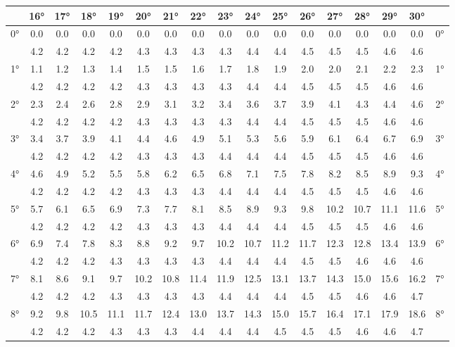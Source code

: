 \begin{scriptsize}\begin{tabular}{c || c | c | c | c | c | c | c | c | c | c | c | c | c | c | c || c}
		\space &16°&17°&18°&19°&20°&21°&22°&23°&24°&25°&26°&27°&28°&29°&30°\\\hline\hline
		\multirow{2}{*}{0°}&0.0&0.0&0.0&0.0&0.0&0.0&0.0&0.0&0.0&0.0&0.0&0.0&0.0&0.0&0.0&\multirow{2}{*}{0°}\\ \space&4.2&4.2&4.2&4.2&4.3&4.3&4.3&4.3&4.4&4.4&4.5&4.5&4.5&4.6&4.6&\space\\\hline
		\multirow{2}{*}{1°}&1.1&1.2&1.3&1.4&1.5&1.5&1.6&1.7&1.8&1.9&2.0&2.0&2.1&2.2&2.3&\multirow{2}{*}{1°}\\ \space&4.2&4.2&4.2&4.2&4.3&4.3&4.3&4.3&4.4&4.4&4.5&4.5&4.5&4.6&4.6&\space\\\hline
		\multirow{2}{*}{2°}&2.3&2.4&2.6&2.8&2.9&3.1&3.2&3.4&3.6&3.7&3.9&4.1&4.3&4.4&4.6&\multirow{2}{*}{2°}\\ \space&4.2&4.2&4.2&4.2&4.3&4.3&4.3&4.3&4.4&4.4&4.5&4.5&4.5&4.6&4.6&\space\\\hline
		\multirow{2}{*}{3°}&3.4&3.7&3.9&4.1&4.4&4.6&4.9&5.1&5.3&5.6&5.9&6.1&6.4&6.7&6.9&\multirow{2}{*}{3°}\\ \space&4.2&4.2&4.2&4.2&4.3&4.3&4.3&4.4&4.4&4.4&4.5&4.5&4.5&4.6&4.6&\space\\\hline
		\multirow{2}{*}{4°}&4.6&4.9&5.2&5.5&5.8&6.2&6.5&6.8&7.1&7.5&7.8&8.2&8.5&8.9&9.3&\multirow{2}{*}{4°}\\ \space&4.2&4.2&4.2&4.2&4.3&4.3&4.3&4.4&4.4&4.4&4.5&4.5&4.5&4.6&4.6&\space\\\hline
		\multirow{2}{*}{5°}&5.7&6.1&6.5&6.9&7.3&7.7&8.1&8.5&8.9&9.3&9.8&10.2&10.7&11.1&11.6&\multirow{2}{*}{5°}\\ \space&4.2&4.2&4.2&4.2&4.3&4.3&4.3&4.4&4.4&4.4&4.5&4.5&4.5&4.6&4.6&\space\\\hline
		\multirow{2}{*}{6°}&6.9&7.4&7.8&8.3&8.8&9.2&9.7&10.2&10.7&11.2&11.7&12.3&12.8&13.4&13.9&\multirow{2}{*}{6°}\\ \space&4.2&4.2&4.2&4.3&4.3&4.3&4.3&4.4&4.4&4.4&4.5&4.5&4.6&4.6&4.6&\space\\\hline
		\multirow{2}{*}{7°}&8.1&8.6&9.1&9.7&10.2&10.8&11.4&11.9&12.5&13.1&13.7&14.3&15.0&15.6&16.2&\multirow{2}{*}{7°}\\ \space&4.2&4.2&4.2&4.3&4.3&4.3&4.3&4.4&4.4&4.4&4.5&4.5&4.6&4.6&4.7&\space\\\hline
		\multirow{2}{*}{8°}&9.2&9.8&10.5&11.1&11.7&12.4&13.0&13.7&14.3&15.0&15.7&16.4&17.1&17.9&18.6&\multirow{2}{*}{8°}\\ \space&4.2&4.2&4.2&4.3&4.3&4.3&4.4&4.4&4.4&4.5&4.5&4.5&4.6&4.6&4.7&\space\\\hline

\end{tabular}
\end{scriptsize}
